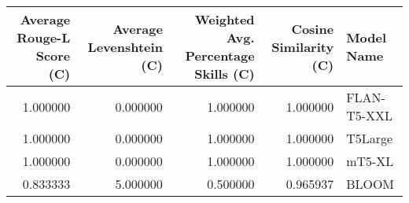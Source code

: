 \begin{tabular}{rrrrl}
\toprule
Average Rouge-L Score (C) & Average Levenshtein (C) & Weighted Avg. Percentage Skills (C) & Cosine Similarity (C) & Model Name \\
\midrule
1.000000 & 0.000000 & 1.000000 & 1.000000 & FLAN-T5-XXL \\
1.000000 & 0.000000 & 1.000000 & 1.000000 & T5Large \\
1.000000 & 0.000000 & 1.000000 & 1.000000 & mT5-XL \\
0.833333 & 5.000000 & 0.500000 & 0.965937 & BLOOM \\
\bottomrule
\end{tabular}
